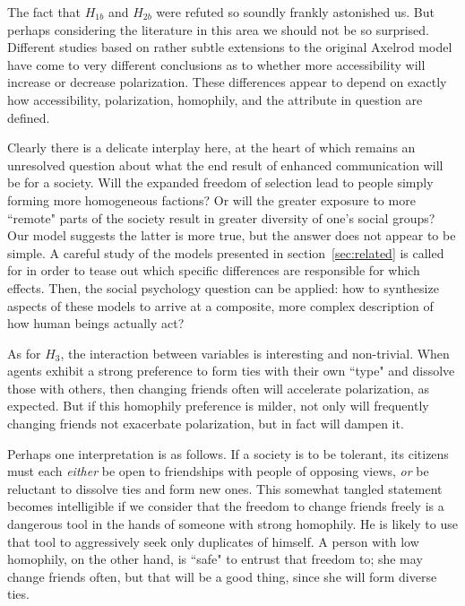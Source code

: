 
The fact that $H_{1b}$ and $H_{2b}$ were refuted so soundly frankly astonished
us. But perhaps considering the literature in this area we should not be so
surprised. Different studies based on rather subtle extensions to the original
Axelrod model have come to very different conclusions as to whether more
accessibility will increase or decrease polarization. These differences appear
to depend on exactly how accessibility, polarization, homophily, and the
attribute in question are defined.

Clearly there is a delicate interplay here, at the heart of which remains an
unresolved question about what the end result of enhanced communication will
be for a society. Will the expanded freedom of selection lead to people
simply forming more homogeneous factions? Or will the greater exposure to
more ``remote" parts of the society result in greater diversity of one's
social groups? Our model suggests the latter is more true, but the answer does
not appear to be simple. A careful study of the models presented in
section~\ref{sec:related} is called for in order to tease out which specific
differences are responsible for which effects. Then, the social psychology
question can be applied: how to synthesize aspects of these models to arrive
at a composite, more complex description of how human beings actually act?

As for $H_3$, the interaction between variables is interesting and
non-trivial. When agents exhibit a strong preference to form ties with their
own ``type" and dissolve those with others, then changing friends often will
accelerate polarization, as expected. But if this homophily preference is
milder, not only will frequently changing friends not exacerbate polarization,
but in fact will dampen it. 

Perhaps one interpretation is as follows. If a society is to be tolerant, its
citizens must each \textit{either} be open to friendships with people of
opposing views, \textit{or} be reluctant to dissolve ties and form new ones.
This somewhat tangled statement becomes intelligible if we consider that the
freedom to change friends freely is a dangerous tool in the hands of someone
with strong homophily. He is likely to use that tool to aggressively seek only
duplicates of himself. A person with low homophily, on the other hand, is
``safe" to entrust that freedom to; she may change friends often, but that
will be a good thing, since she will form diverse ties.
